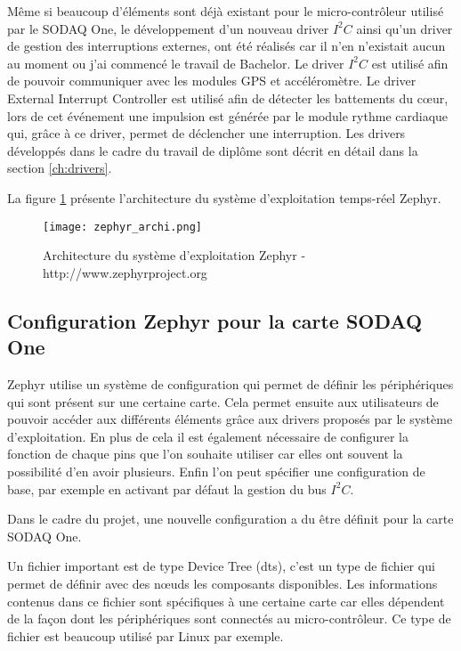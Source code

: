 Même si beaucoup d'éléments sont déjà existant pour le micro-contrôleur utilisé par le SODAQ One, le développement d'un nouveau driver $I^{2}C$ ainsi qu'un driver de gestion des interruptions externes, ont été réalisés car il n'en n'existait aucun au moment ou j'ai commencé le travail de Bachelor. Le driver $I^{2}C$ est utilisé afin de pouvoir communiquer avec les modules GPS et accéléromètre. Le driver External Interrupt Controller est utilisé afin de détecter les battements du cœur, lors de cet événement une impulsion est générée par le module rythme cardiaque qui, grâce à ce driver, permet de déclencher une interruption. Les drivers développés dans le cadre du travail de diplôme sont décrit en détail dans la section \ref{ch:drivers}.

La figure \ref{fig:zephyr_archi} présente l'architecture du système d'exploitation temps-réel Zephyr.

\begin{figure}[htb]
\centering 
\texttt{[image: zephyr\_archi.png]} 
\caption{Architecture du système d'exploitation Zephyr - http://www.zephyrproject.org}
\label{fig:zephyr_archi}
\end{figure}

\subsection{Configuration Zephyr pour la carte SODAQ One}

Zephyr utilise un système de configuration qui permet de définir les périphériques qui sont présent sur une certaine carte. Cela permet ensuite aux utilisateurs de pouvoir accéder aux différents éléments grâce aux drivers proposés par le système d'exploitation. En plus de cela il est également nécessaire de configurer la fonction de chaque pins que l'on souhaite utiliser car elles ont souvent la possibilité d'en avoir plusieurs. Enfin l'on peut spécifier une configuration de base, par exemple en activant par défaut la gestion du bus $I^{2}C$.

Dans le cadre du projet, une nouvelle configuration a du être définit pour la carte SODAQ One.

Un fichier important est de type Device Tree (dts), c'est un type de fichier qui permet de définir avec des nœuds les composants disponibles. Les informations contenus dans ce fichier sont spécifiques à une certaine carte car elles dépendent de la façon dont les périphériques sont connectés au micro-contrôleur. Ce type de fichier est beaucoup utilisé par Linux par exemple.

